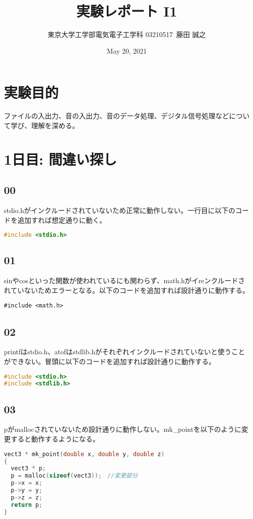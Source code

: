 \documentclass{ltjsarticle}
\title{実験レポート I1}
\author{東京大学工学部電気電子工学科 03210517\ 藤田 誠之 }
\date{ May 20, 2021}
\begin{document}
\maketitle
\section{実験目的}
ファイルの入出力、音の入出力、音のデータ処理、デジタル信号処理などについて学び、理解を深める。
\section{1日目: 間違い探し}
\subsection{00}
stdio.hがインクルードされていないため正常に動作しない。一行目に以下のコードを追加すれば想定通りに動く。
\begin{lstlisting}[caption=p00.c 変更部分,language=C]
#include <stdio.h>
\end{lstlisting}
\subsection{01}
sinやcosといった関数が使われているにも関わらず、math.hがイreンクルードされていないためエラーとなる。以下のコードを追加すれば設計通りに動作する。
\begin{lstlisting}[caption=p01.c 変更部分language=C]
#include <math.h>
\end{lstlisting}
\subsection{02}
printfはstdio.h、atofはstdlib.hがそれぞれインクルードされていないと使うことができない。冒頭に以下のコードを追加すれば設計通りに動作する。
\begin{lstlisting}[caption=p02.c 変更部分,language=C]
#include <stdio.h>
#include <stdlib.h>
\end{lstlisting}

\subsection{03}
pがmallocされていないため設計通りに動作しない。mk\_pointを以下のように変更すると動作するようになる。

\begin{lstlisting}[caption=p03.c 変更部分,language=C]
vect3 * mk_point(double x, double y, double z)
{
  vect3 * p;
  p = malloc(sizeof(vect3));　//変更部分
  p->x = x;
  p->y = y;
  p->z = z;
  return p;
}
\end{lstlisting}
\end{document}
